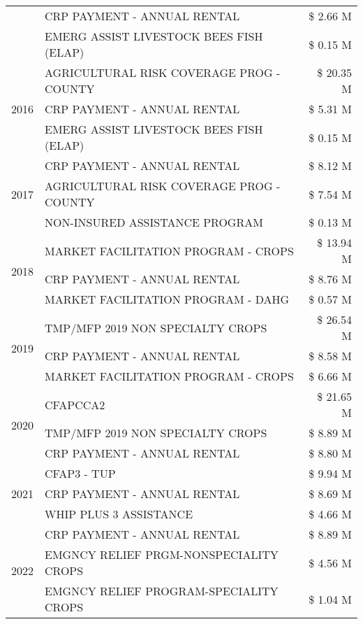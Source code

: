 \begin{tabular}{llr}
 & CRP PAYMENT - ANNUAL RENTAL & \$ 2.66 M \\
 & EMERG ASSIST LIVESTOCK BEES FISH (ELAP) & \$ 0.15 M \\
\cline{1-3}
\multirow[t]{3}{*}{2016} & AGRICULTURAL RISK COVERAGE PROG - COUNTY & \$ 20.35 M \\
 & CRP PAYMENT - ANNUAL RENTAL & \$ 5.31 M \\
 & EMERG ASSIST LIVESTOCK BEES FISH (ELAP) & \$ 0.15 M \\
\cline{1-3}
\multirow[t]{3}{*}{2017} & CRP PAYMENT - ANNUAL RENTAL & \$ 8.12 M \\
 & AGRICULTURAL RISK COVERAGE PROG - COUNTY & \$ 7.54 M \\
 & NON-INSURED ASSISTANCE PROGRAM & \$ 0.13 M \\
\cline{1-3}
\multirow[t]{3}{*}{2018} & MARKET FACILITATION PROGRAM - CROPS & \$ 13.94 M \\
 & CRP PAYMENT - ANNUAL RENTAL & \$ 8.76 M \\
 & MARKET FACILITATION PROGRAM - DAHG & \$ 0.57 M \\
\cline{1-3}
\multirow[t]{3}{*}{2019} & TMP/MFP 2019 NON SPECIALTY CROPS & \$ 26.54 M \\
 & CRP PAYMENT - ANNUAL RENTAL & \$ 8.58 M \\
 & MARKET FACILITATION PROGRAM - CROPS & \$ 6.66 M \\
\cline{1-3}
\multirow[t]{3}{*}{2020} & CFAPCCA2 & \$ 21.65 M \\
 & TMP/MFP 2019 NON SPECIALTY CROPS & \$ 8.89 M \\
 & CRP PAYMENT - ANNUAL RENTAL & \$ 8.80 M \\
\cline{1-3}
\multirow[t]{3}{*}{2021} & CFAP3 - TUP & \$ 9.94 M \\
 & CRP PAYMENT - ANNUAL RENTAL & \$ 8.69 M \\
 & WHIP PLUS 3 ASSISTANCE & \$ 4.66 M \\
\cline{1-3}
\multirow[t]{3}{*}{2022} & CRP PAYMENT - ANNUAL RENTAL & \$ 8.89 M \\
 & EMGNCY RELIEF PRGM-NONSPECIALITY CROPS & \$ 4.56 M \\
 & EMGNCY RELIEF PROGRAM-SPECIALITY CROPS & \$ 1.04 M \\
\cline{1-3}
\bottomrule
\end{tabular}
